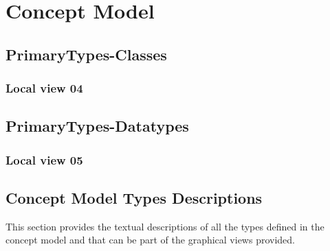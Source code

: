 
\chapter{Concept Model}
\label{chap:lu.uni.lassy.excalibur.icrash-spec-CM}


\section{PrimaryTypes-Classes}
\subsection{Local view 04}
\label{sec:lu.uni.lassy.excalibur.icrash-spec-CM-view-local-PrimaryTypes-Classes-04}




\section{PrimaryTypes-Datatypes}
\subsection{Local view 05}
\label{sec:lu.uni.lassy.excalibur.icrash-spec-CM-view-local-PrimaryTypes-Datatypes-05}










\section{Concept Model Types Descriptions}
This section provides the textual descriptions of all the types defined in the concept model and that can be part of the graphical views provided.












